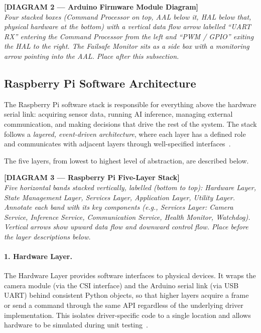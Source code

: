 \bigskip
\noindent\textbf{[DIAGRAM 2 — Arduino Firmware Module Diagram]}\\
\textit{Four stacked boxes (Command Processor on top, AAL below it,
HAL below that, physical hardware at the bottom) with a vertical data
flow arrow labelled ``UART RX'' entering the Command Processor from
the left and ``PWM / GPIO'' exiting the HAL to the right. The
Failsafe Monitor sits as a side box with a monitoring arrow pointing
into the AAL. Place after this subsection.}
\bigskip
 
\subsection{Raspberry Pi Software Architecture}
 
The Raspberry Pi software stack is responsible for everything above
the hardware serial link: acquiring sensor data, running AI inference,
managing external communication, and making decisions that drive the
rest of the system. The stack follows a \emph{layered,
event-driven architecture}, where each layer has a defined role and
communicates with adjacent layers through well-specified
interfaces~\cite{bass2021software}.
 
The five layers, from lowest to highest level of abstraction, are
described below.
 
\bigskip
\noindent\textbf{[DIAGRAM 3 — Raspberry Pi Five-Layer Stack]}\\
\textit{Five horizontal bands stacked vertically, labelled (bottom to
top): Hardware Layer, State Management Layer, Services Layer,
Application Layer, Utility Layer. Annotate each band with its key
components (e.g., Services Layer: Camera Service, Inference Service,
Communication Service, Health Monitor, Watchdog). Vertical arrows show
upward data flow and downward control flow. Place before the layer
descriptions below.}
\bigskip
 
\paragraph{1. Hardware Layer.}
The Hardware Layer provides software interfaces to physical devices.
It wraps the camera module (via the CSI interface) and the Arduino
serial link (via USB UART) behind consistent Python objects, so that
higher layers acquire a frame or send a command through the same API
regardless of the underlying driver implementation. This isolates
driver-specific code to a single location and allows hardware to be
simulated during unit testing~\cite{gamma1994design}.
 
